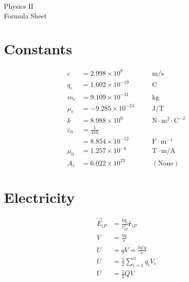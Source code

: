 \documentclass[10pt]{article}
\newcommand{\scinot}[2]{\ensuremath{#1 \times 10^{#2}}}
\begin{document}
\raggedleft
\footnotesize
\begin{multicols*}{5}

\setlength{\premulticols}{1pt}
\setlength{\postmulticols}{1pt}
\setlength{\multicolsep}{1pt}
\setlength{\columnsep}{2pt}

\begin{center}
    \Large
    Physics \textrm{II} \\
    Formula Sheet
\end{center}

\section{Constants}

\begin{alignat*}{2}
    c   &= \scinot{2.998}{8}   && \quad \mathrm{m / s}\\
    q_e &= \scinot{1.602}{-19} && \quad \mathrm{C}\\
    m_e &= \scinot{9.109}{-31} && \quad \mathrm{kg}\\
    \mu_e &= \scinot{-9.285}{-24} && \quad \mathrm{J/T}\\
    k   &= \scinot{8.988}{9}   && \quad \mathrm{N \cdot m^2 \cdot
    C^{-2}}\\
    \varepsilon_0 &= \frac{1}{4\pi k} \\
        &= \scinot{8.854}{-12} && \quad \mathrm{F \cdot m^{-1}}\\
	\mu_0 &= \scinot{1.257}{-6} && \quad \mathrm{T \cdot m/A}\\
    A_v &= \scinot{6.022}{23} && \quad (\text{None})
\end{alignat*}

\section{Electricity}

\begin{align*}
    \vec{E}_{iP} &= \frac{kq_i}{r_{iP}^2} \hat{\mathbf{r}}_{iP}\\
    V &= \frac{kq}{r}\\
    U &= qV = \frac{kq'q}{r}\\
    U &= \frac{1}{2} \sum_{i=1}^n q_i V_i\\
    U &= \frac{1}{2} QV
\end{align*}


\end{multicols*}
\end{document}
